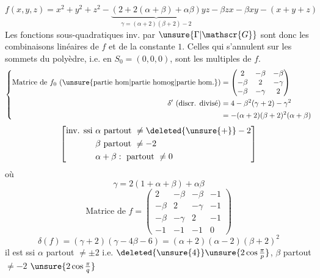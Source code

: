 \[
f(x,y,z)=x^2+y^2+z^2-\underbrace{(2+2(\alpha+\beta)+\alpha\beta)}_{\gamma=(\alpha+2)(\beta+2)-2}yz-\beta zx-\beta xy-(x+y+z)
\]
Les fonctions sous-quadratiques inv. par $\unsure{\Gamma|\mathscr{G}}$ sont donc les combinaisons linéaires de $f$ et de la constante $1$. Celles qui s'annulent sur les sommets du polyèdre, i.e. en $S_0=(0,0,0)$, sont les multiples de $f$.
\[
\left\{\begin{aligned}
\text{Matrice de }f_0\ \text{(\unsure{partie hom|partie homog|partie hom.})}&=\begin{pmatrix}
2&-\beta&-\beta\\-\beta&2&-\gamma\\-\beta&-\gamma&2
\end{pmatrix}\\
\delta'\ (\text{discr. divisé})&=4-\beta^2(\gamma+2)-\gamma^2\\
&=-(\alpha+2)(\beta+2)^2(\alpha+\beta)
\end{aligned}\right.
\]
\[
\left[\begin{aligned}
\text{inv. ssi }&\alpha\text{ partout }\ne\deleted{\unsure{+}}-2\\
&\beta\text{ partout }\ne-2\\
&\alpha+\beta:\text{ partout }\ne0
\end{aligned}\right]
\]
où
\[
\gamma=2(1+\alpha+\beta)+\alpha\beta
\]
\[
\text{Matrice de }f=\begin{pmatrix}
2&-\beta&-\beta&-1\\
-\beta&2&-\gamma&-1\\
-\beta&-\gamma&2&-1\\
-1&-1&-1&0
\end{pmatrix}
\]
\[
\delta(f)=(\gamma+2)(\gamma-4\beta-6)=(\alpha+2)(\alpha-2)(\beta+2)^2
\]
\diagram{\begin{tikzcd}[ampersand replacement=\&]
{}\arrow[d,bend left=15]\\{}
\end{tikzcd}}
il est  ssi $\alpha$ partout $\ne\pm2$ i.e. $\deleted{\unsure{4}}\unsure{2\cos\frac{\pi}{p}}$, $\beta$ partout $\ne-2$ $\unsure{2\cos\frac{\pi}{q}}$

